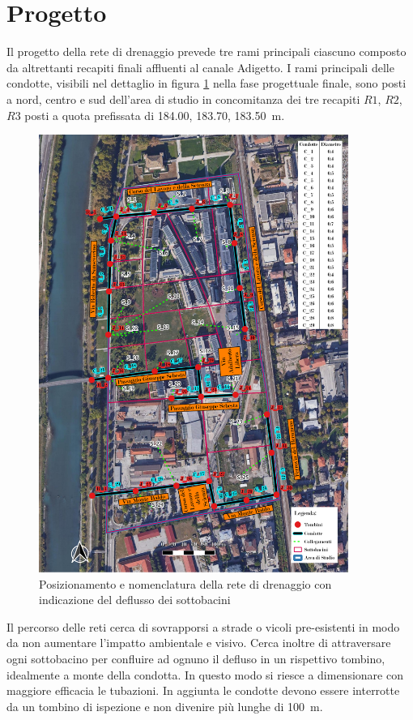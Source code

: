 \section{Progetto}
Il progetto della rete di drenaggio prevede tre rami principali ciascuno composto da altrettanti recapiti finali affluenti al canale Adigetto. 
I rami principali delle condotte, visibili nel dettaglio in figura \ref{fig:Condotte} nella fase progettuale finale, sono posti a nord, centro e sud dell'area di studio in concomitanza dei tre recapiti $R1$, $R2$, $R3$ posti a quota prefissata di \SI{184.00}{}, \SI{183.70}{}, \SI{183.50}{\metre}.
\begin{figure}[p]
    \centering
    \includegraphics[trim=0cm 0cm 0cm 0cm,clip,frame,width=0.9\textwidth]{IMG/Nomenclatura_condotte.pdf} 
    \caption{Posizionamento e nomenclatura della rete di drenaggio con indicazione del deflusso dei sottobacini}
    \label{fig:Condotte}
\end{figure}

Il percorso delle reti cerca di sovrapporsi a strade o vicoli pre-esistenti in modo da non aumentare l'impatto ambientale e visivo. 
Cerca inoltre di attraversare ogni sottobacino per confluire ad ognuno il defluso in un rispettivo tombino, idealmente a monte della condotta. 
In questo modo si riesce a dimensionare con maggiore efficacia le tubazioni. 
In aggiunta le condotte devono essere interrotte da un tombino di ispezione e non divenire più lunghe di \SI{100}{\metre}.

